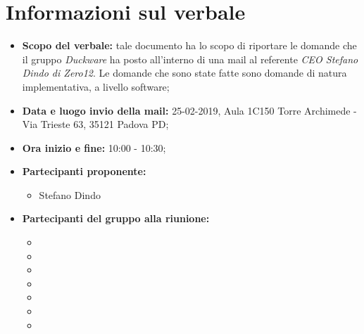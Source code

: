 \clearpage
\section{Informazioni sul verbale}
\begin{itemize}
	\item \textbf {Scopo del verbale:} tale documento ha lo scopo di riportare le domande che il gruppo \emph{Duckware} ha posto all'interno di una mail al referente \emph{CEO Stefano Dindo di Zero12}. Le domande che sono state fatte sono domande di natura implementativa, a livello software;
	\item \textbf {Data e luogo invio della mail:} 25-02-2019, Aula 1C150 Torre Archimede - Via Trieste 63, 35121 Padova PD;
	\item \textbf {Ora inizio e fine:} 10:00 - 10:30;
	\item \textbf {Partecipanti proponente:} 
		\begin{itemize}
			\item Stefano Dindo
		\end{itemize}
	\item \textbf {Partecipanti del gruppo alla riunione:} 
		 \begin{itemize}
			\item \sonia
			\item \luca
			\item \matteo
			\item \pardeep
			\item \alberto
			\item \alessandro
			\item \andrea
		\end{itemize}
\end{itemize}